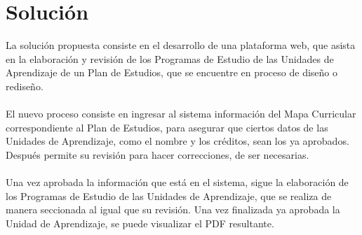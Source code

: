 \section{Solución}
La solución propuesta consiste en el desarrollo de una plataforma web, que asista en la elaboración y revisión de los  Programas de Estudio de las Unidades de Aprendizaje de un Plan de Estudios, que se encuentre en proceso de diseño o rediseño.\\
\\
El nuevo proceso consiste en ingresar al sistema información del Mapa Curricular correspondiente al Plan de Estudios, para asegurar que ciertos datos de las Unidades de Aprendizaje, como el nombre y los créditos, sean los ya aprobados. Después permite su revisión para hacer correcciones, de ser necesarias.\\
\\
Una vez aprobada la información que está en el sistema, sigue la elaboración de los Programas de Estudio de las Unidades de Aprendizaje, que se realiza de manera seccionada al igual que su revisión. Una vez finalizada ya aprobada la Unidad de Aprendizaje, se puede visualizar el PDF resultante.\\
